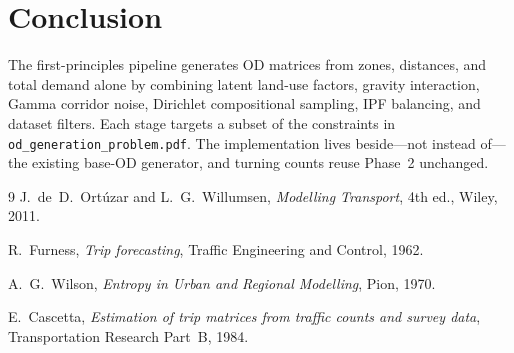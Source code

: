 \documentclass[11pt,a4paper]{report}
\begin{document}
\chapter*{Conclusion}

The first-principles pipeline generates OD matrices from zones, distances, and total demand alone by combining latent land-use factors, gravity interaction, Gamma corridor noise, Dirichlet compositional sampling, IPF balancing, and dataset filters. Each stage targets a subset of the constraints in \texttt{od\_generation\_problem.pdf}. The implementation lives beside---not instead of---the existing base-OD generator, and turning counts reuse Phase~2 unchanged.

\begin{thebibliography}{9}
J.~de~D.~Ort\'{u}zar and L.~G.~Willumsen,
\emph{Modelling Transport}, 4th ed., Wiley, 2011.

R.~Furness, \emph{Trip forecasting}, Traffic Engineering and Control, 1962.

A.~G.~Wilson,
\emph{Entropy in Urban and Regional Modelling}, Pion, 1970.

E.~Cascetta,
\emph{Estimation of trip matrices from traffic counts and survey data},
Transportation Research Part~B, 1984.
\end{thebibliography}
\end{document}

